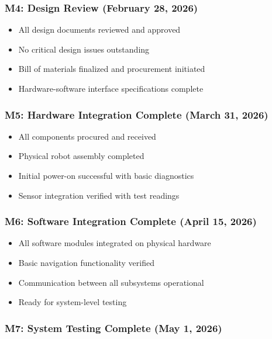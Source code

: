 \subsubsection{M4: Design Review (February 28, 2026)}

\begin{itemize}
    \item All design documents reviewed and approved
    \item No critical design issues outstanding
    \item Bill of materials finalized and procurement initiated
    \item Hardware-software interface specifications complete
\end{itemize}

\subsubsection{M5: Hardware Integration Complete (March 31, 2026)}

\begin{itemize}
    \item All components procured and received
    \item Physical robot assembly completed
    \item Initial power-on successful with basic diagnostics
    \item Sensor integration verified with test readings
\end{itemize}

\subsubsection{M6: Software Integration Complete (April 15, 2026)}

\begin{itemize}
    \item All software modules integrated on physical hardware
    \item Basic navigation functionality verified
    \item Communication between all subsystems operational
    \item Ready for system-level testing
\end{itemize}

\subsubsection{M7: System Testing Complete (May 1, 2026)}

